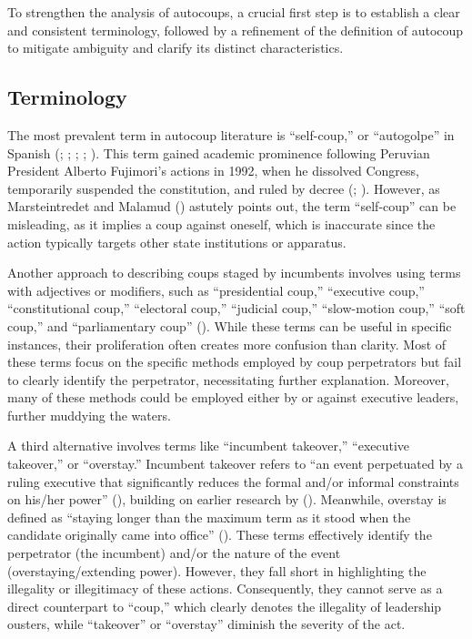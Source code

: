 \documentclass[
  12pt,
]{report}
\begin{document}
To strengthen the analysis of autocoups, a crucial first step is to
establish a clear and consistent terminology, followed by a refinement
of the definition of autocoup to mitigate ambiguity and clarify its
distinct characteristics.

\subsection{Terminology}\label{terminology}

The most prevalent term in autocoup literature is ``self-coup,'' or
``autogolpe'' in Spanish (; ;
; ; ). This term gained academic prominence following Peruvian
President Alberto Fujimori's actions in 1992, when he dissolved
Congress, temporarily suspended the constitution, and ruled by decree
(;
). However, as
Marsteintredet and Malamud ()
astutely points out, the term ``self-coup'' can be misleading, as it
implies a coup against oneself, which is inaccurate since the action
typically targets other state institutions or apparatus.

Another approach to describing coups staged by incumbents involves using
terms with adjectives or modifiers, such as ``presidential coup,''
``executive coup,'' ``constitutional coup,'' ``electoral coup,''
``judicial coup,'' ``slow-motion coup,'' ``soft coup,'' and
``parliamentary coup'' (). While these terms can be useful in specific
instances, their proliferation often creates more confusion than
clarity. Most of these terms focus on the specific methods employed by
coup perpetrators but fail to clearly identify the perpetrator,
necessitating further explanation. Moreover, many of these methods could
be employed either by or against executive leaders, further muddying the
waters.

A third alternative involves terms like ``incumbent takeover,''
``executive takeover,'' or ``overstay.'' Incumbent takeover refers to
``an event perpetuated by a ruling executive that significantly reduces
the formal and/or informal constraints on his/her power''
(), building on
earlier research by (). Meanwhile,
overstay is defined as ``staying longer than the maximum term as it
stood when the candidate originally came into office''
(). These terms effectively identify the perpetrator (the incumbent)
and/or the nature of the event (overstaying/extending power). However,
they fall short in highlighting the illegality or illegitimacy of these
actions. Consequently, they cannot serve as a direct counterpart to
``coup,'' which clearly denotes the illegality of leadership ousters,
while ``takeover'' or ``overstay'' diminish the severity of the act.
\end{document}
